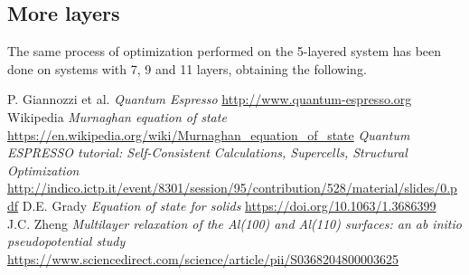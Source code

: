 \documentclass[a4paper, 11pt]{article}
\begin{document}
    \begin{figure}[H]
      \centering
      \begin{subfigure}[Behavior of total energy and $\Delta z_{01}$ with respect to $t_v$ with 10 horizontal n k points.]{
        \label{fig:nl5_nk10}}
      \end{subfigure}
      \begin{subfigure}[Relaxation of the layers during the simulation. Solid line with $t_v, n_k^h$ respectively 18 \si{.a.u}, 10; dashed line with 25 \si{.a.u}, 12]{
        \label{fig:nl5_relaxation}}
      \end{subfigure}
    \end{figure}

  \subsection{More layers}
    The same process of optimization performed on the 5-layered system has been done on systems with 7, 9 and 11 layers, obtaining the following.








\begin{thebibliography}{100}
   P. Giannozzi et al. \emph{Quantum Espresso}  \url{http://www.quantum-espresso.org}
   Wikipedia \emph{Murnaghan equation of state}  \url{https://en.wikipedia.org/wiki/Murnaghan_equation_of_state}
    \emph{Quantum ESPRESSO tutorial:  Self-Consistent Calculations, Supercells, Structural Optimization}  \url{http://indico.ictp.it/event/8301/session/95/contribution/528/material/slides/0.pdf}
   D.E. Grady \emph{Equation of state for solids}  \url{https://doi.org/10.1063/1.3686399}
   J.C. Zheng \emph{Multilayer  relaxation  of  the  Al(100)  and  Al(110)  surfaces: an  ab  initio  pseudopotential  study}  \url{https://www.sciencedirect.com/science/article/pii/S0368204800003625}
\end{thebibliography}
\end{document}
